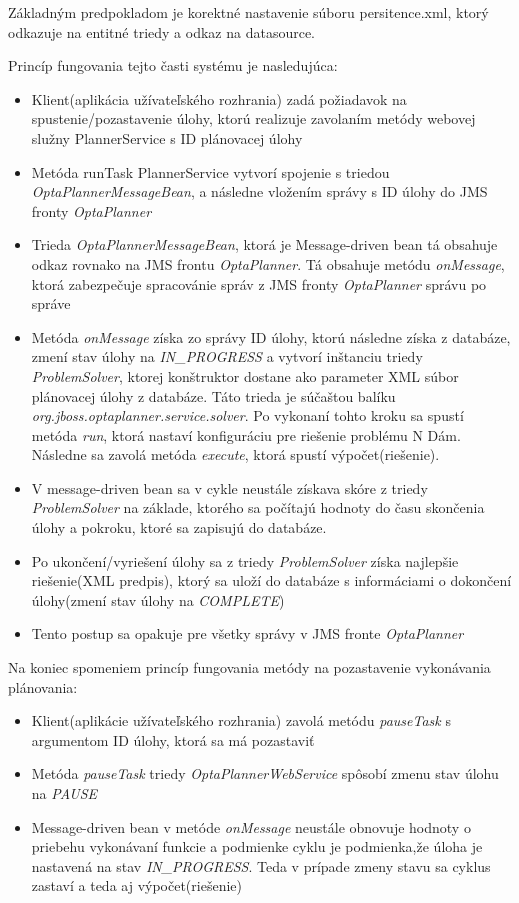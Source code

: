Základným predpokladom je korektné nastavenie súboru persitence.xml, ktorý odkazuje na entitné triedy a odkaz na datasource.

Princíp fungovania tejto časti systému je nasledujúca:
\begin{itemize}
\item Klient(aplikácia užívateľského rozhrania) zadá požiadavok na spustenie/pozastavenie úlohy, ktorú realizuje zavolaním metódy webovej služny PlannerService s ID plánovacej úlohy
\item Metóda runTask PlannerService vytvorí spojenie s triedou \emph{OptaPlannerMessageBean}, a následne vložením správy s ID úlohy do JMS fronty \emph{OptaPlanner}
\item Trieda \emph{OptaPlannerMessageBean}, ktorá je Message-driven bean tá obsahuje odkaz rovnako na JMS frontu \emph{OptaPlanner}. Tá obsahuje metódu \emph{onMessage}, ktorá zabezpečuje spracovánie správ z JMS fronty \emph{OptaPlanner} správu po správe
\item Metóda \emph{onMessage} získa zo správy ID úlohy, ktorú následne získa z databáze, zmení stav úlohy na \emph{IN\_PROGRESS} a vytvorí inštanciu triedy \emph{ProblemSolver}, ktorej konštruktor dostane ako parameter XML súbor plánovacej úlohy z databáze. Táto trieda je súčaštou balíku \\\emph{org.jboss.optaplanner.service.solver}. Po vykonaní tohto kroku sa spustí metóda \emph{run}, ktorá nastaví konfiguráciu pre riešenie problému N Dám. Následne sa zavolá metóda \emph{execute}, ktorá spustí výpočet(riešenie).
\item V message-driven bean sa v cykle neustále získava skóre z triedy \emph{ProblemSolver} na základe, ktorého sa počítajú hodnoty do času skončenia úlohy a pokroku, ktoré sa zapisujú do databáze.
\item Po ukončení/vyriešení úlohy sa z triedy \emph{ProblemSolver} získa najlepšie riešenie(XML predpis), ktorý sa uloží do databáze s informáciami o dokončení úlohy(zmení stav úlohy na \emph{COMPLETE})
\item Tento postup sa opakuje pre všetky správy v JMS fronte \emph{OptaPlanner}
\end{itemize}

Na koniec spomeniem princíp fungovania metódy na pozastavenie vykonávania plánovania:
\begin{itemize}
\item Klient(aplikácie užívateľského rozhrania) zavolá metódu \emph{pauseTask} s argumentom ID úlohy, ktorá sa má pozastaviť
\item Metóda \emph{pauseTask} triedy \emph{OptaPlannerWebService} spôsobí zmenu stav úlohu na \emph{PAUSE}
\item Message-driven bean v metóde \emph{onMessage} neustále obnovuje hodnoty o priebehu vykonávaní funkcie a podmienke cyklu je podmienka,že úloha je nastavená na stav \emph{IN\_PROGRESS}. Teda v prípade zmeny stavu sa cyklus zastaví a teda aj výpočet(riešenie)
\end{itemize}
	
